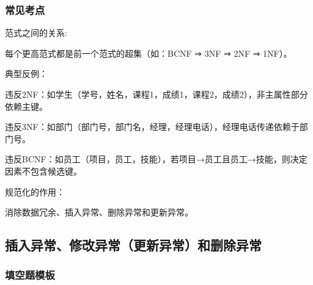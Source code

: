\documentclass[a4paper,12pt,UTF8,fontset=none]{ctexart}
\begin{document}
\subsubsection{常见考点}
\noindent 范式之间的关系:

每个更高范式都是前一个范式的超集（如：BCNF ⇒ 3NF ⇒ 2NF ⇒ 1NF）。

\noindent 典型反例：

违反2NF：如学生（学号，姓名，课程1，成绩1，课程2，成绩2），非主属性部分依赖主键。

违反3NF：如部门（部门号，部门名，经理，经理电话），经理电话传递依赖于部门号。

违反BCNF：如员工（项目，员工，技能），若项目→员工且员工→技能，则决定因素不包含候选键。

\noindent 规范化的作用：

消除数据冗余、插入异常、删除异常和更新异常。

\subsection{ 插入异常、修改异常（更新异常）和删除异常 }
\subsubsection{填空题模板}
\end{document}
